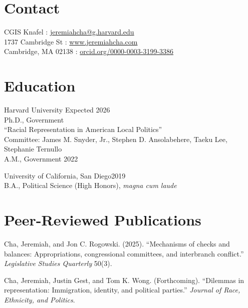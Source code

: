 \documentclass[margin, line]{res}
\begin{document}
\begin{resume}

\section{Contact}
CGIS Knafel \hfill \Letter: \href{mailto:jeremiahcha@g.harvard.edu}{jeremiahcha@g.harvard.edu}\\
1737 Cambridge St \hfill \Mundus: \href{httsp://www.jeremiahcha.com}{www.jeremiahcha.com}\\
Cambridge, MA 02138 \hfill \Mundus: \href{https://orcid.org/0000-0003-3199-3386}{orcid.org/0000-0003-3199-3386}

\section{Education}
Harvard University \hfill Expected 2026\\
\hspace*{5mm} Ph.D., Government\\
\hspace*{10mm} {\footnotesize ``Racial Representation in American Local Politics''}\\
\hspace*{10mm} {\footnotesize Committee: James M. Snyder, Jr., Stephen D. Ansolabehere, Taeku Lee, Stephanie Ternullo}\\
\hspace*{5mm} A.M., Government \hfill 2022

University of California, San Diego\hfill 2019\\
\hspace*{5mm} B.A., Political Science (High Honors), \textit{magna cum laude} 

\section{Peer-Reviewed Publications}
\begin{etaremune}
    \item Cha, Jeremiah, and Jon C. Rogowski. (2025). ``Mechanisms of checks and balances: Appropriations, congressional committees, and interbranch conflict.'' \emph{Legislative Studies Quarterly} 50(3).
    \item Cha, Jeremiah, Justin Gest, and Tom K. Wong. (Forthcoming). ``Dilemmas in representation: Immigration, identity, and political parties.'' \emph{Journal of Race, Ethnicity, and Politics}.
\end{etaremune}


\end{resume}
\end{document}

